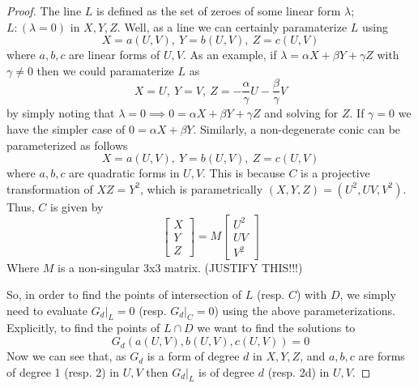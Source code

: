 \begin{proof}
The line $L$ is defined as the set of zeroes of some linear form $\lambda$; $L:(\lambda=0)$
in $X,Y,Z$. Well, as a line we can certainly paramaterize $L$ using 
\[
X=a(U,V),~Y=b(U,V),~Z=c(U,V)
\]
where $a, b, c$ are linear forms of $U,V$. As an example, if $\lambda = \alpha X + \beta Y + \gamma Z$
with $\gamma \ne 0$ then we could paramaterize $L$ as
\[
X = U,~Y=V,~Z=-\frac{\alpha}{\gamma}U - \frac{\beta}{\gamma}V
\]
by simply noting that $\lambda = 0 \implies 0 = \alpha X + \beta Y + \gamma Z$ and solving
for $Z$. If $\gamma = 0$ we have the simpler case of $0 = \alpha X + \beta Y$.
Similarly, a non-degenerate conic can be parameterized as follows
\[
X=a(U,V),~Y=b(U,V),~Z=c(U,V)
\]
where $a,b,c$ are quadratic forms in $U,V$. This is because $C$ is a projective
transformation of $XZ=Y^2$, which is parametrically $(X,Y,Z) = (U^2,UV,V^2)$.
Thus, $C$ is given by 
\[
\begin{bmatrix}
X\\
Y\\
Z
\end{bmatrix}
=
M
\begin{bmatrix}
U^2\\
UV\\
V^2
\end{bmatrix}
\]
Where $M$ is a non-singular 3x3 matrix. (JUSTIFY THIS!!!)

So, in order to find the points of intersection of $L$ (resp. $C$) with $D$,
we simply need to evaluate $G_d|_L=0$ (resp. $G_d|_C=0$) using the above parameterizations.
Explicitly, to find the points of $L \cap D$ we want to find the solutions to
\[
	G_d(a(U,V),b(U,V),c(U,V)) = 0
\]
Now we can see that, as $G_d$ is a form of degree $d$ in $X,Y,Z$, and $a,b,c$ are forms
of degree 1 (resp. 2) in $U,V$ then $G_d|_L$ is of degree $d$ (resp. 2d) in $U,V$.
\end{proof}
